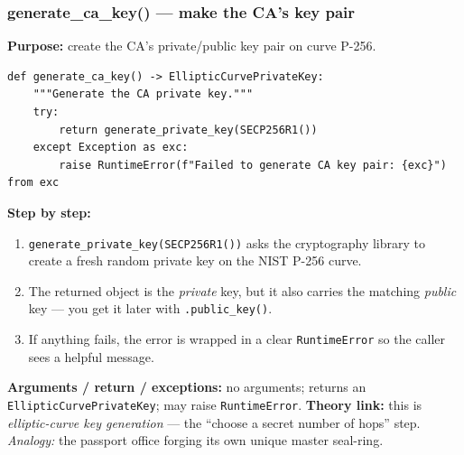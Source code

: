 \documentclass[11pt,a4paper]{report}
\begin{document}
\subsubsection*{generate\_ca\_key() --- make the CA's key pair}
\textbf{Purpose:} create the CA's private/public key pair on curve P-256.
\begin{lstlisting}[style=py,caption={ca/ca.py --- generate the CA key pair.}]
def generate_ca_key() -> EllipticCurvePrivateKey:
    """Generate the CA private key."""
    try:
        return generate_private_key(SECP256R1())
    except Exception as exc:
        raise RuntimeError(f"Failed to generate CA key pair: {exc}") from exc
\end{lstlisting}
\textbf{Step by step:}
\begin{enumerate}
  \item \texttt{generate\_private\_key(SECP256R1())} asks the cryptography
        library to create a fresh random private key on the NIST P-256 curve.
  \item The returned object is the \emph{private} key, but it also carries the
        matching \emph{public} key --- you get it later with
        \texttt{.public\_key()}.
  \item If anything fails, the error is wrapped in a clear \texttt{RuntimeError}
        so the caller sees a helpful message.
\end{enumerate}
\textbf{Arguments / return / exceptions:} no arguments; returns an
\texttt{EllipticCurvePrivateKey}; may raise \texttt{RuntimeError}.
\textbf{Theory link:} this is \emph{elliptic-curve key generation} --- the
``choose a secret number of hops'' step. \emph{Analogy:} the passport office
forging its own unique master seal-ring.
\end{document}
